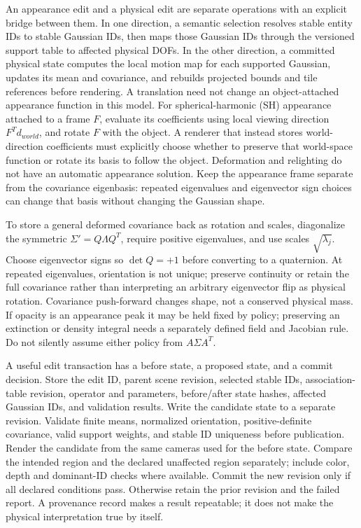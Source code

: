 An appearance edit and a physical edit are separate operations with an explicit bridge between them. In one direction, a semantic selection resolves stable entity IDs to stable Gaussian IDs, then maps those Gaussian IDs through the versioned support table to affected physical DOFs. In the other direction, a committed physical state computes the local motion map for each supported Gaussian, updates its mean and covariance, and rebuilds projected bounds and tile references before rendering. A translation need not change an object-attached appearance function in this model. For spherical-harmonic (SH) appearance attached to a frame \(F\), evaluate its coefficients using local viewing direction \(F^Td_{world}\), and rotate \(F\) with the object. A renderer that instead stores world-direction coefficients must explicitly choose whether to preserve that world-space function or rotate its basis to follow the object. Deformation and relighting do not have an automatic appearance solution. Keep the appearance frame separate from the covariance eigenbasis: repeated eigenvalues and eigenvector sign choices can change that basis without changing the Gaussian shape.

To store a general deformed covariance back as rotation and scales, diagonalize the symmetric \(\Sigma'=Q\Lambda Q^T\), require positive eigenvalues, and use scales \(\sqrt{\lambda_j}\). Choose eigenvector signs so \(\det Q=+1\) before converting to a quaternion. At repeated eigenvalues, orientation is not unique; preserve continuity or retain the full covariance rather than interpreting an arbitrary eigenvector flip as physical rotation. Covariance push-forward changes shape, not a conserved physical mass. If opacity is an appearance peak it may be held fixed by policy; preserving an extinction or density integral needs a separately defined field and Jacobian rule. Do not silently assume either policy from \(A\Sigma A^T\).

A useful edit transaction has a before state, a proposed state, and a commit decision. Store the edit ID, parent scene revision, selected stable IDs, association-table revision, operator and parameters, before/after state hashes, affected Gaussian IDs, and validation results. Write the candidate state to a separate revision. Validate finite means, normalized orientation, positive-definite covariance, valid support weights, and stable ID uniqueness before publication. Render the candidate from the same cameras used for the before state. Compare the intended region and the declared unaffected region separately; include color, depth and dominant-ID checks where available. Commit the new revision only if all declared conditions pass. Otherwise retain the prior revision and the failed report. A provenance record makes a result repeatable; it does not make the physical interpretation true by itself.

